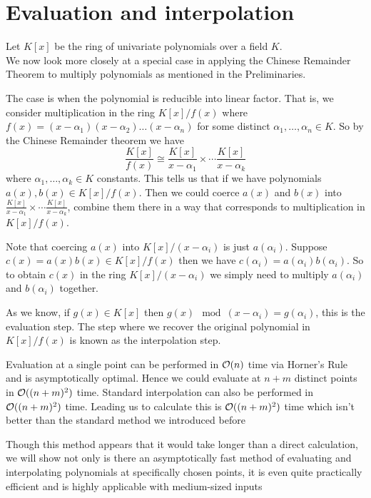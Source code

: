 \chapter{Evaluation and interpolation}\label{chapter2}

Let $K[x]$ be the ring of univariate polynomials over a field $K$.\\
We now look more closely at a special case in applying the Chinese Remainder Theorem to multiply polynomials as mentioned in the Preliminaries.

The case is when the polynomial is reducible into linear factor. That is, we consider multiplication in the ring $K[x] / f(x)$ where $f(x) = (x - \alpha_1)(x - \alpha_2) \ldots (x - \alpha_n)$ for some distinct $\alpha_1, \ldots, \alpha_n \in K$. So by the Chinese Remainder theorem we have
\[
    \frac{K[x]}{f(x)} \cong \frac{K[x]}{x - \alpha_1} \times \cdots \frac{K[x]}{x - \alpha_k}
\]
where $\alpha_1, \ldots, \alpha_k \in K$ constants. This tells us that if we have polynomials $a(x), b(x) \in K[x] / f(x)$. Then we could coerce $a(x)$ and $b(x)$ into $\frac{K[x]}{x - \alpha_1} \times \cdots \frac{K[x]}{x - \alpha_k}$, combine them there in a way that corresponds to multiplication in $K[x] / f(x)$. 

Note that coercing $a(x)$ into $K[x] / (x - \alpha_i)$ is just $a(\alpha_i)$. Suppose $c(x) = a(x)b(x) \in K[x] / f(x)$ then we have $c(\alpha_i) = a(\alpha_i)b(\alpha_i)$. So to obtain $c(x)$ in the ring $K[x] / (x - \alpha_i)$ we simply need to multiply $a(\alpha_i)$ and $b(\alpha_i)$ together.

As we know, if $g(x) \in K[x]$ then $g(x) \mod (x - \alpha_i) = g(\alpha_i)$, this is the evaluation step. The step where we recover the original polynomial in $K[x]/f(x)$ is known as the interpolation step.

Evaluation at a single point can be performed in $\mathcal O(n)$ time via Horner's Rule and is asymptotically optimal. Hence we could evaluate at $n + m$ distinct points in $\mathcal O((n + m)^2)$ time. Standard interpolation can also be performed in $\mathcal O((n+m)^2)$ time. Leading us to calculate this is $\mathcal O((n + m)^2)$ time which isn't better than the standard method we introduced before

Though this method appears that it would take longer than a direct calculation, we will show not only is there an asymptotically fast method of evaluating and interpolating polynomials at specifically chosen points, it is even quite practically efficient and is highly applicable with medium-sized inputs

